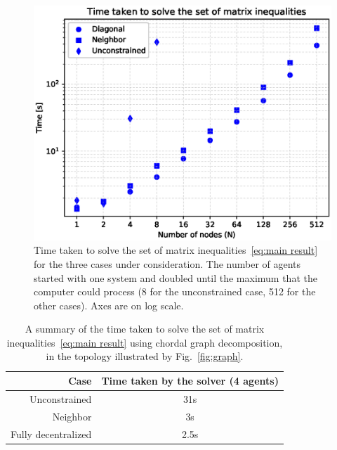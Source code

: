 \documentclass[10pt,twocolumn,twoside]{IEEEtran}
\theoremstyle{plain}
\theoremstyle{definition}
\theoremstyle{remark}
\begin{document}
\begin{figure}[htpb!]
	\centering
	\includegraphics[width=\columnwidth]{./imgs/ParserTimes}\vspace{-2em}
	\caption{Time taken to solve the set of matrix inequalities~\eqref{eq:main result} for the three cases under consideration. The number of agents started with one system and doubled  until the maximum that the computer could process (8 for the unconstrained case, 512 for the other cases). Axes are on log scale.}
	\label{fig:time graph}
\end{figure}

\begin{table}
	\begin{tabular}{r|c}
	Case&Time taken by the solver (4 agents)\\ \hline
	Unconstrained&31s\\
	Neighbor&3s\\
	Fully decentralized&2.5s\\\hline
	\end{tabular}\vspace{1em}
	\caption{A summary of the time taken to solve the set of matrix inequalities~\eqref{eq:main result} using chordal graph decomposition, in the topology illustrated by Fig.~\ref{fig:graph}.}
	\label{tab:chain case}
\end{table}
\end{document}
